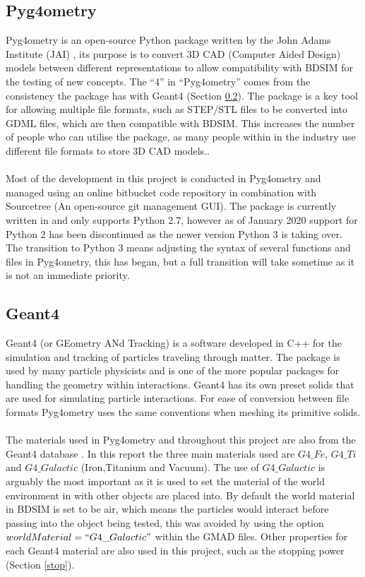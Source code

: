 \documentclass[12pt,a4paper]{article}
\begin{document}
\subsection{Pyg4ometry}
\label{pyg}
Pyg4ometry is an open-source Python package  written by the John Adams Institute (JAI) \cite{jai}, its purpose is to convert 3D CAD (Computer Aided Design) models between different representations to allow compatibility with BDSIM for the testing of new concepts. The ``4'' in ``Pyg4ometry'' comes from the consistency the package has with Geant4 (Section \ref{geant4}). The package is a key tool for allowing multiple file formats, such as STEP/STL files to be converted into GDML files, which are then compatible with BDSIM. This increases the number of people who can utilise the package, as many people within in the industry use different file formats to store 3D CAD models..
\\\\
Most of the development in this project is conducted in Pyg4ometry and managed using an online bitbucket code repository \cite{bitb} in combination with Sourcetree \cite{st} (An open-source git management GUI). The package is currently written in and only supports Python 2.7, however as of January 2020 support for Python 2 has been discontinued as the newer version Python 3 is taking over. The transition to Python 3 means adjusting the syntax of several functions and files in Pyg4ometry, this has began, but a full transition will take sometime as it is not an immediate priority. 

\subsection{Geant4}\label{geant4}
\label{g4}
Geant4 (or GEometry ANd Tracking) is a software developed in C++ for the simulation and tracking of particles traveling through matter. The package is used by many particle physicists and is one of the more popular packages for handling the geometry within interactions. Geant4 has its own preset solids that are used for simulating particle interactions. For ease of conversion between file formats Pyg4ometry uses the same conventions when meshing its primitive solids.
\\\\
The materials used in Pyg4ometry and throughout this project are also from the Geant4 database \cite{mater}. In this report the three main materials used are $G4\_Fe$, $G4\_Ti$ and $G4\_Galactic$ (Iron,Titanium and Vacuum). The use of $G4\_Galactic$ is arguably the most important as it is used to set the material of the world environment in with other objects are placed into. By default the world material in BDSIM is set to be air, which means the particles would interact before passing into the object being tested, this was avoided by using the option $worldMaterial=``G4\_Galactic"$ within the GMAD files. Other properties for each Geant4 material are also used in this project, such as the stopping power (Section \ref{stop}).
\end{document}
